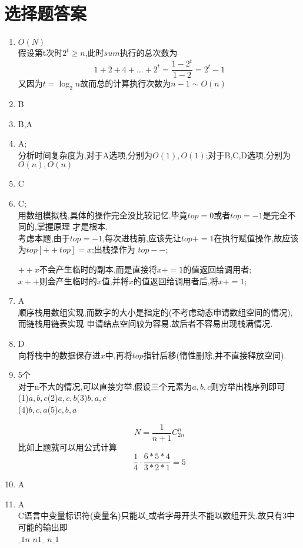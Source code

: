 \documentclass[12pt, a4paper, oneside, UTF8]{ctexbook}
\begin{document}
\section{选择题答案}
\begin{enumerate}[label=\arabic*.\textbf{答案}:]
    \item $O(N)$ \\
    假设第t次时$2^t\geq n$,此时$sum$执行的总次数为 
    $$
    1 + 2 + 4 + \ldots + 2^t = \frac{1-2^t}{1-2}=2^t - 1
    $$
    又因为$t=\log_2{n}$故而总的计算执行次数为$n-1\sim O(n)$
    \item B 
    \item B,A 
    \item A;\\ 
    分析时间复杂度为,对于A选项,分别为$O(1),O(1)$;对于B,C,D选项,分别为$O(n),O(n)$
    \item C 
    \item C;  \\
    用数组模拟栈,具体的操作完全没比较记忆.毕竟$top=0$或者$top=-1$是完全不同的,掌握原理
    才是根本. \\
    考虑本题,由于$top=-1$,每次进栈前,应该先让$top+=1$在执行赋值操作,故应该为$top[++top]=x$;出栈操作为
    $top--$;
    \begin{remark}[区分$++x$和$x++$]
        $++x$不会产生临时的副本,而是直接将$x+=1$的值返回给调用者; \\
        $x++$则会产生临时的$x$值,并将$x$的值返回给调用者后,将$x+=1$;
    \end{remark}
    \item A \\
    顺序栈用数组实现,而数字的大小是指定的(不考虑动态申请数组空间的情况),而链栈用链表实现
    申请结点空间较为容易.故后者不容易出现栈满情况.

    \item D \\
    向将栈中的数据保存进$x$中,再将$top$指针后移(惰性删除,并不直接释放空间). 

    \item 5个 \\
    对于n不大的情况,可以直接穷举.假设三个元素为$a,b,c$则穷举出栈序列即可 \\
    (1)$a,b,c$\qquad (2)$a,c,b$\qquad (3)$b,a,c$\\
    (4)$b,c,a$\qquad (5)$c,b,a$ 
    \begin{remark}[求n个不同元素的出栈序列的个数]
        $$
        N=\frac{1}{n+1}C_{2n}^{n} 
        $$
        比如上题就可以用公式计算 
        $$
        \frac{1}{4}\cdot\frac{6*5*4}{3*2*1} = 5
        $$
    \end{remark}
    \item A 
    \item A \\
    C语言中变量标识符(变量名)只能以$\_$或者字母开头不能以数组开头.故只有3中可能的输出即\\
    $\_1n$ \qquad $n1\_$ \qquad $n\_ 1$ 


\end{enumerate}
\end{document}

